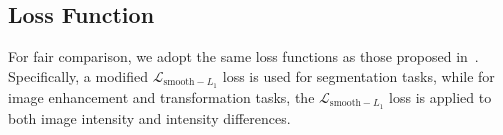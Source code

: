 \subsection{Loss Function}
For fair comparison, we adopt the same loss functions as those proposed in~\cite{hu2025building}. Specifically, a modified $\mathcal{L}_{\text{smooth}-L_{1}}$ loss is used for segmentation tasks, while for image enhancement and transformation tasks, the $\mathcal{L}_{\text{smooth}-L_{1}}$ loss is applied to both image intensity and intensity differences.



